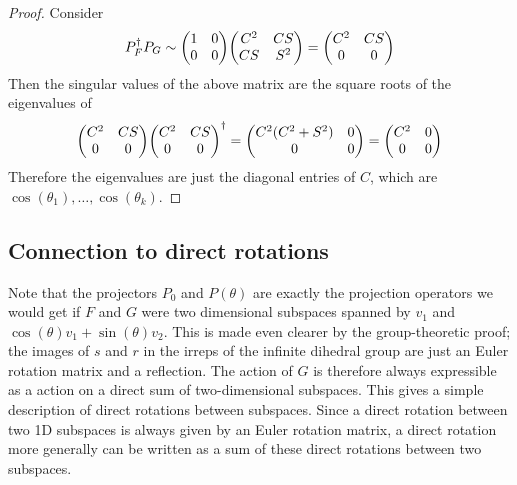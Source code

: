 \documentclass[11pt]{article}
\begin{document}
\begin{proof}
    Consider
    $$
    P_F^\dagger P_G \sim \mqty(1 & 0 \\ 0 & 0) \mqty(C^2 & CS \\ CS & S^2) = \mqty(C^2 & CS \\ 0 & 0)
    $$
    Then the singular values of the above matrix are the square roots of the eigenvalues of
    $$
    \mqty(C^2 & CS \\ 0 & 0) \mqty(C^2 & CS \\ 0 & 0)^\dagger = \mqty(C^2(C^2+S^2) & 0 \\ 0 & 0) = \mqty(C^2 & 0 \\ 0 & 0)
    $$
    Therefore the eigenvalues are just the diagonal entries of $C$, which are $\cos(\theta_1), \dots, \cos(\theta_k)$. 
\end{proof}

\subsection{Connection to direct rotations}
Note that the projectors $P_0$ and $P(\theta)$ are exactly the projection operators we would get if $F$ and $G$ were two dimensional subspaces spanned by $v_1$ and $\cos(\theta)v_1 + \sin(\theta)v_2$. This is made even clearer by the group-theoretic proof; the images of $s$ and $r$ in the irreps of the infinite dihedral group are just an Euler rotation matrix and a reflection. The action of $G$ is therefore always expressible as a action on a direct sum of two-dimensional subspaces. This gives a simple description of direct rotations between subspaces. Since a direct rotation between two 1D subspaces is always given by an Euler rotation matrix, a direct rotation more generally can be written as a sum of these direct rotations between two subspaces.

\nocite{*}


\end{document}
